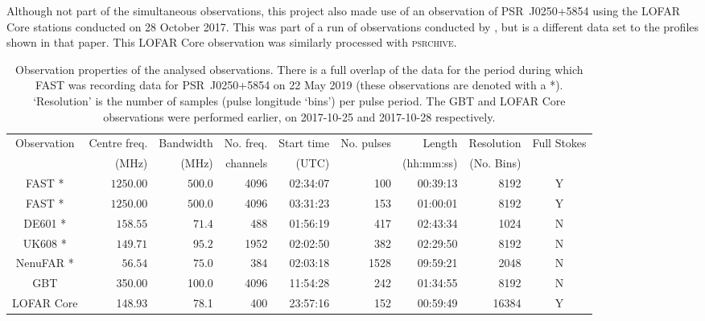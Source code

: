 Although not part of the simultaneous observations, this project also made use of an observation of PSR~J0250+5854 using the LOFAR Core stations \citep{HWG+2013} conducted on 28 October 2017. This was part of a run of observations conducted by \citet{TBC+2018}, but is a different data set to the profiles shown in that paper. This LOFAR Core observation was similarly processed with \textsc{psrchive}.

\begin{landscape} %
    \begin{table}
        \centering
        \caption[Summary of the simultaneous observations of PSR~J0250+5854]{Observation properties of the analysed observations. There is a full overlap of the data for the period during which FAST was recording data for PSR~J0250+5854 on 22 May 2019 (these observations are denoted with a *). `Resolution' is the number of samples (pulse longitude `bins') per pulse period. The GBT and LOFAR Core observations were performed earlier, on 2017-10-25 and 2017-10-28 respectively.}
        \label{tab: J0250 - observations}
        \begin{tabular}{crrrrrrrc} %
            \hline
            Observation & Centre freq. & Bandwidth & No. freq. & Start time & No. pulses & Length & Resolution & Full Stokes\\
            & (MHz) & (MHz) & channels & (UTC) & & (hh:mm:ss) & (No. Bins)&\\
            \hline
            FAST *        & $1250.00$ & $500.0$   & 4096 & 02:34:07  & 100   & 00:39:13  & 8192 & Y\\
            FAST *	    & $1250.00$ & $500.0$   & 4096 & 03:31:23 & 153   & 01:00:01  & 8192 & Y\\
            DE601 *        & $158.55$  & $71.4$    & 488  & 01:56:19  & 417   & 02:43:34  & 1024  & N \\
            UK608 *  & $149.71$  & $95.2$    & 1952 & 02:02:50  & 382   & 02:29:50  & 8192  & N\\
            NenuFAR *     & $56.54$   & $75.0$    & 384  & 02:03:18  & 1528  & 09:59:21  & 2048  & N \\
            \hline
            GBT & 350.00 & 100.0 & 4096 & 11:54:28 & 242 & 01:34:55 & 8192 & N\\
            LOFAR Core & 148.93 & 78.1 & 400 & 23:57:16 & 152 & 00:59:49 & 16384 & Y\\
            \hline
        \end{tabular}
    \end{table}
    \end{landscape}











